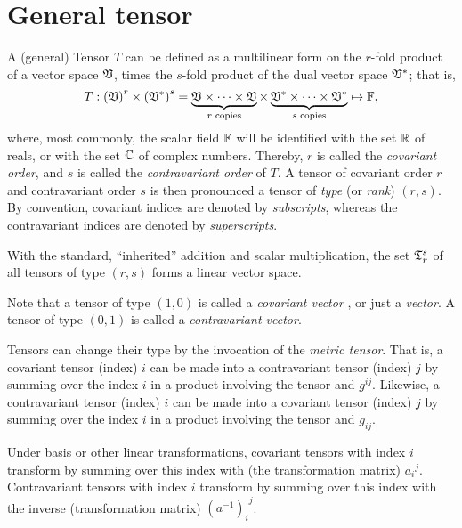 \section{General tensor}

A (general) Tensor $T$ can be defined as a multilinear form  on the
$r$-fold product of a vector space ${\frak V}$, times the
$s$-fold product of the dual vector space ${\frak V}^\ast$;
that is,
\begin{equation}
T: \left( {\frak V} \right)^r \times \left( {\frak V}^\ast \right)^s
=
\underbrace{{\frak V}\times \cdots \times {\frak V}}_{r\textrm{ \scriptsize copies}}
\times
\underbrace{{\frak V}^\ast \times \cdots \times {\frak V}^\ast}_{s\textrm{ \scriptsize copies}}
\mapsto {\Bbb F}
,
 \label{2012-m-ch-tensor-gdt}
\end{equation}
where, most commonly, the scalar field
${\Bbb F}$
will be identified with the set ${\Bbb R}$ of reals,
or with the set ${\Bbb C}$ of complex numbers.
Thereby,
$r$ is called the
{\em covariant order}, and
$s$ is called the
{\em contravariant order}
of $T$.
A tensor of covariant order $r$ and contravariant order $s$
is then pronounced a tensor of
{\em type} (or {\em rank})
$(r,s)$.
By convention, covariant indices are denoted by {\em subscripts},
whereas the contravariant indices  are denoted by {\em superscripts}.

With the standard, ``inherited'' addition and scalar multiplication,
the set ${\frak T}_r^s$ of all tensors of type $(r,s)$
forms a linear vector space.


Note that a tensor of type $(1,0)$ is called  a
{\em covariant vector}
,
or just a
{\em vector}.
A tensor of type $(0,1)$ is called a
{\em contravariant vector}. 

Tensors can change their type by the invocation of the {\em metric tensor}.
That is, a covariant tensor (index) $i$ can be made into a contravariant tensor (index) $j$
by summing over the index $i$ in a product involving the tensor and $g^{ij}$.
Likewise,  a contravariant tensor (index) $i$ can be made into a covariant tensor (index) $j$
by summing over the index $i$ in a product involving the tensor and $g_{ij}$.


Under basis or other linear transformations,
covariant tensors with index $i$ transform by summing over this index with (the transformation matrix) ${a_i}^j$.
Contravariant tensors with index $i$ transform by summing over this index with the inverse (transformation matrix)  ${(a^{-1})_i}^j$.

